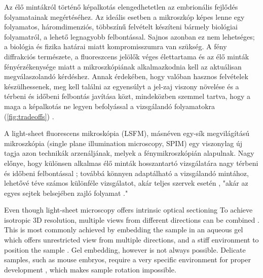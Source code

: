 \documentclass{booklet_style}
\begin{document}
Az élő mintákról történő képalkotás elengedhetetlen az embrionális fejlődés folyamatainak megértéséhez. Az ideális esetben a mikroszkóp képes lenne egy folyamatos, háromdimenziós, többszínű felvételt készíteni bármely biológiai folyamatról, a lehető legnagyobb felbontással. Sajnos azonban ez nem lehetséges; a biológia és fizika határai miatt kompromisszumra van szükség. A fény diffrakciós természete, a fluoreszcens jelölők véges élettartama és az élő minták fényérzékenysége miatt a mikroszkópiának alkalmazkodnia kell az aktuálisan megválaszolandó kérdéshez. Annak érdekében, hogy valóban hasznos felvételek készülhessenek, meg kell találni az egyensúlyt a jel-zaj viszony növelése és a térbeni és időbeni felbontás javítása közt, mindeközben szemmel tartva, hogy a maga a képalkotás ne legyen befolyással a vizsgálandó folyamatokra (\autoref{fig:tradeoffs}) \cite{laissue_assessing_2017}.

A light-sheet fluorescens mikroskópia (LSFM), másnéven egy-sík megvilágítású mikroszkópia (single plane illumination microscopy, SPIM) \cite{huisken_optical_2004} egy viszonylag új tagja azon technikák arzenáljának, melyek a fénymikroszkópián alapulnak. Nagy előnye, hogy különsen alkalmas élő minták hosszantartó vizsgálatára nagy térbeni és időbeni felbontással \cite{keller_quantitative_2008, huisken_selective_2009, weber_light_2011,tomer_shedding_2011}; továbbá könnyen adaptálható a vizsgálandó mintához, lehetővé téve számos különféle vizsgálatot, akár teljes szervek esetén \cite{dodt_ultramicroscopy:_2007}, "akár az egyes sejtek belsejében zajló folyamat \cite{chen_lattice_2014}."


Even though light-sheet microscopy offers intrinsic optical sectioning
To achieve isotropic 3D resolution, multiple views from different directions can be combined \cite{preibisch_efficient_2014}. This is most commonly achieved by embedding the sample in an aqueous gel which offers unrestricted view from multiple directions, and a stiff environment to position the sample \cite{krzic_multiview_2012}. Gel embedding, however is not always possible. Delicate samples, such as mouse embryos, require a very specific environment for proper development \cite{doherty_culture_2000}, which makes sample rotation impossible.
\end{document}
